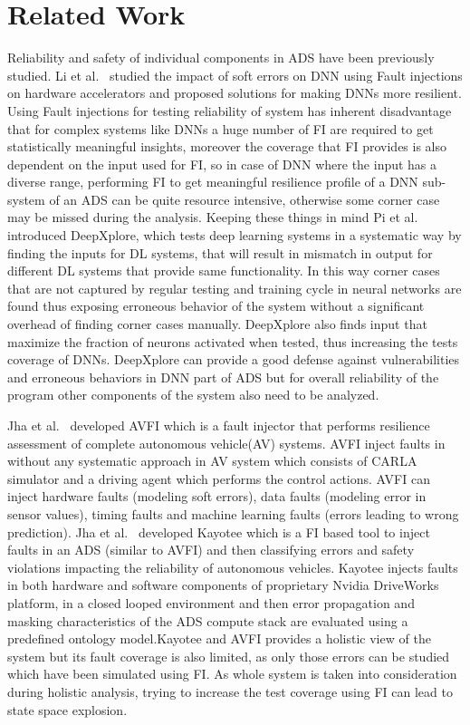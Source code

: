 \section{Related Work} \label{related_work}

Reliability and safety of individual components in ADS have been previously studied. Li et al.~\cite{guanpeng17sc} studied the impact of soft errors on DNN using Fault injections on hardware accelerators and proposed solutions for making DNNs more resilient. Using Fault injections for testing reliability of system has inherent disadvantage that for complex systems like DNNs a huge number of FI are required to get statistically meaningful insights, moreover the coverage that FI provides is also dependent on the input used for FI, so in case of DNN where the input has a diverse range, performing FI to get meaningful resilience profile of a DNN sub-system of an ADS can be quite resource intensive, otherwise some corner case may be missed during the analysis. Keeping these things in mind Pi et al.~\cite{kexin17sosp} introduced DeepXplore, which tests deep learning systems in a systematic way by finding the inputs for DL systems, that will result in mismatch in output for different DL systems that provide same functionality. In this way corner cases that are not captured by regular testing and training cycle in neural networks are found thus exposing erroneous behavior of the system without a significant overhead of finding corner cases manually. DeepXplore also finds input that maximize the fraction of neurons activated when tested, thus increasing the tests coverage of DNNs. DeepXplore can provide a good defense against vulnerabilities and erroneous behaviors in DNN part of ADS but for overall reliability of the program other components of the system also need to be analyzed.

Jha et al.~\cite{jha18dsn} developed AVFI which is a fault injector that performs resilience assessment of complete autonomous vehicle(AV) systems. AVFI inject faults in without any systematic approach in AV system which consists of CARLA simulator and a driving agent which performs the control actions. AVFI can inject hardware faults (modeling soft errors), data faults (modeling error in sensor values), timing faults and machine learning faults (errors leading to wrong prediction). Jha et al.~\cite{jha18art} developed Kayotee which is a FI based tool to inject faults in an ADS (similar to AVFI) and then classifying errors and safety violations impacting the reliability of autonomous vehicles. Kayotee injects faults in both hardware and software components of proprietary Nvidia DriveWorks platform, in a closed looped environment and then error propagation and masking characteristics of the ADS compute stack are evaluated using a predefined ontology model.Kayotee and AVFI provides a holistic view of the system but its  fault coverage is also limited, as only those errors can be studied which have been simulated using FI. As whole system is taken into consideration during holistic analysis, trying to increase the test coverage using FI can lead to state space explosion.  